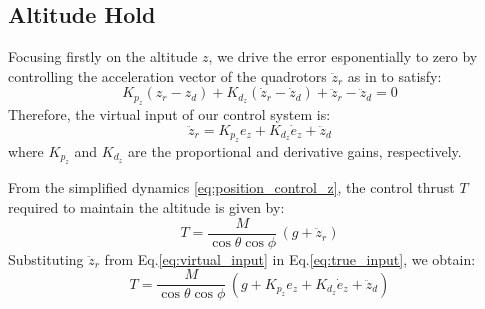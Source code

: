\subsection{Altitude Hold}
Focusing firstly on the altitude $z$,
we drive the error esponentially to zero by controlling the acceleration
vector of the quadrotors $\ddot{z}_r$ as in \cite{simplified_model} to satisfy:
\[
 K_{p_z} ( z_r - z_d )  + K_{d_z} (\dot{z}_r - \dot{z}_d ) + \ddot{z}_r - \ddot{z}_d = 0
\]
\noindent
Therefore, the virtual input of our control system is:
\begin{equation}
    \ddot{z}_r  =  K_{p_z} e_z + K_{d_z} \dot{e}_z + \ddot{z}_d
    \label{eq:virtual_input}
\end{equation}
where \( K_{p_z} \) and \( K_{d_z} \) are the  proportional and derivative gains, respectively.

\noindent
From the simplified dynamics \eqref{eq:position_control_z}, 
the control thrust \( T \) required to maintain the altitude is given by:
\begin{equation}
    T = \frac{M}{\cos\theta \cos\phi} \, (g + \ddot{z}_r)
    \label{eq:true_input}
\end{equation}
\noindent
Substituting \( \ddot{z}_r \) from Eq.\ref{eq:virtual_input} in Eq.\ref{eq:true_input},
we obtain:
\[
T = \frac{M}{\cos\theta \cos\phi} \, \left( g + K_{p_z} e_z + K_{d_z} \dot{e}_z + \ddot{z}_d \right)
\]

